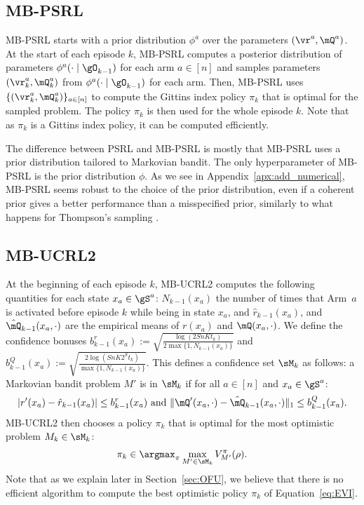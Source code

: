 \subsection{MB-PSRL}
MB-PSRL starts with a prior distribution \(\phi^{a}\) over the parameters \((\vr^a,\mQ^a)\). At the start of each episode $k$, MB-PSRL computes
a posterior distribution of parameters \(\phi^a(\cdot \mid\gO_{k-1})\) for
each arm $a\in[n]$ and samples parameters \((\vr_k^a,\mQ_k^a)\) from
\(\phi^a(\cdot \mid\gO_{k-1})\) for each arm. Then, MB-PSRL uses \(\{(\vr_k^a,\mQ_k^a)\}_{a\in[n]}\)
to compute the Gittins index policy $\pi_k$ that is optimal for the sampled
problem.  The policy \(\pi_k\)  is then used for the whole episode \(k\). Note that as $\pi_k$ is a Gittins index policy, it can be computed efficiently. 

The difference between PSRL and MB-PSRL is mostly that MB-PSRL uses a prior distribution tailored to Markovian bandit.  The only hyperparameter of MB-PSRL is the prior distribution $\phi$. As we see in Appendix~\ref{apx:add_numerical},
MB-PSRL seems robust to the choice of the prior distribution, even if a
coherent prior gives a better performance than a misspecified prior, similarly
to what happens for Thompson's sampling \cite{russo2018tutorial}. 

\subsection{MB-UCRL2}
At the beginning of each episode $k$, MB-UCRL2 computes the following quantities for each state $x_a\in\gS^a$: $N_{k-1}(x_a)$ the number of times that Arm~$a$ is activated before episode $k$ while being in state $x_a$, and $\hat{r}_{k-1}(x_a)$, and $\hat{\mQ}_{k-1}(x_a,\cdot)$ are the empirical means of $r(x_a)$ and $\mQ(x_a,\cdot)$. We define the confidence bonuses
$b^r_{k-1}(x_a):=\sqrt{\frac{\log(2SnKt_{k})}{2\max\{1,N_{k-1}(x_a)\}}}$
and
$b^Q_{k-1}(x_a):=\sqrt{\frac{2\log(SnK2^St_k)}{\max\{1,N_{k-1}(x_a)\}}}$.
This defines a confidence set $\sM_k$  as follows:  a Markovian bandit problem $M'$
is in $\sM_k$ if for all $a\in[n]$ and $x_a\in\gS^a$: 
\begin{align}
    \label{eq:conf_rq}
    \vert{r'}(x_a) - \hat{r}_{k-1}(x_a)\vert \le b^r_{k-1}(x_a) \text{ and }
    \lVert {\mQ'}(x_a,\cdot) - \hat{\mQ}_{k-1}(x_a,\cdot)\rVert_1 \le b^Q_{k-1}(x_a).            
\end{align}
MB-UCRL2 then chooses a policy $\pi_k$ that is optimal for the most optimistic problem $M_k\in\sM_k$:
\begin{align}
    \pi_k \in \argmax_{\pi} \max_{M'\in\sM_k}V^{\pi}_{M'}(\rho).
    \label{eq:EVI}
\end{align}
Note that as we explain later in Section~\ref{sec:OFU}, we believe that there is no  efficient algorithm to compute the best optimistic policy $\pi_k$ of Equation~\eqref{eq:EVI}.

